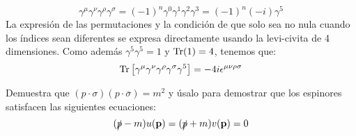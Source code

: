 \begin{solucion}
\begin{enumerate}[label=\alph*)]
		\begin{equation*}
			\gamma^\mu \gamma^\nu \gamma^\rho \gamma^\sigma = (-1)^n \gamma^0\gamma^1\gamma^2\gamma^3 = (-1)^n (-i) \gamma^5
		\end{equation*}
		La expresión de las permutaciones y la condición de que solo sea no nula cuando los índices sean diferentes se expresa directamente usando la levi-civita de 4 dimensiones. Como además $\gamma^5 \gamma^5 = 1$ y  $\Tr (1) = 4$, tenemos que:
		\begin{equation*}
			\Tr \left[ \gamma^\mu \gamma^\nu \gamma^\rho \gamma^\sigma \gamma^5 \right]  = - 4 i \epsilon^{\mu \nu \rho \sigma}
		\end{equation*}
	\end{enumerate}
\end{solucion}




\begin{ejercicio} 
Demuestra que $(p\cdot \sigma)(p\cdot \overline{\sigma}) = m^2$ y úsalo para demostrar que los espinores satisfacen las siguientes ecuaciones:
\begin{equation*}
	( \slashed{p} - m ) u (\mathbf{p}) = (  \slashed{p}+ m) v(\mathbf{p}) = 0
\end{equation*}
\end{ejercicio}


